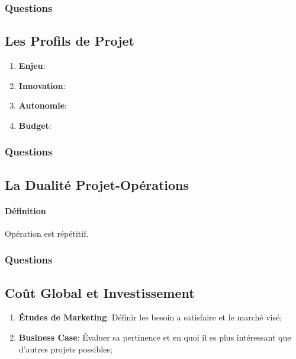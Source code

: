 \documentclass{article}
\begin{document}
\subsubsection{Questions}


\subsection{Les Profils de Projet}
\begin{enumerate}
    \item \textbf{Enjeu}:
    \item \textbf{Innovation}:
    \item \textbf{Autonomie}:
    \item \textbf{Budget}:
\end{enumerate}

\subsubsection{Questions}


\subsection{La Dualité Projet-Opérations}
\paragraph{Définition}Opération est répétitif.

\subsubsection{Questions}


\subsection{Coût Global et Investissement}
\begin{enumerate}[]
    \item \textbf{Études de Marketing}: Définir les besoin a satisfaire et le marché visé;
    \item \textbf{Business Case}: Évaluer sa pertinence et en quoi il es plus intéressant que d'autres projets possibles; 
\end{enumerate}
\end{document}
